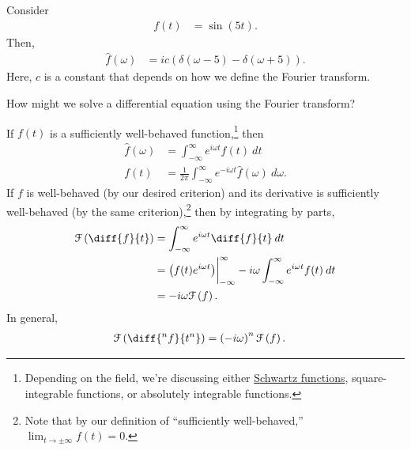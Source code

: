 \documentclass[10pt]{mypackage}
\begin{document}
\begin{example}
  Consider
  \begin{align*}
    f(t) &= \sin\left( 5t \right).
  \end{align*}
  Then,
  \begin{align*}
    \hat{f}\left( \omega \right) &= ic\left( \delta\left(\omega - 5\right) - \delta\left( \omega + 5 \right) \right).
  \end{align*}
  Here, $c$ is a constant that depends on how we define the Fourier transform.
\end{example}
\begin{example}
  How might we solve a differential equation using the Fourier transform?\newline

  If $f(t)$ is a sufficiently well-behaved function,\footnote{Depending on the field, we're discussing either \href{https://en.wikipedia.org/wiki/Schwartz_space}{Schwartz functions}, square-integrable functions, or absolutely integrable functions.} then
  \begin{align*}
    \hat{f}\left( \omega \right) &= \int_{-\infty}^{\infty} e^{i\omega t}f(t)\:dt\\
    f(t) &= \frac{1}{2\pi}\int_{-\infty}^{\infty} e^{-i\omega t}\hat{f}(\omega)\:d\omega.
  \end{align*}
  If $f$ is well-behaved (by our desired criterion) and its derivative is sufficiently well-behaved (by the same criterion),\footnote{Note that by our definition of ``sufficiently well-behaved,'' $\lim_{t\rightarrow\pm\infty}f(t) = 0$.} then by integrating by parts,
  \begin{align*}
    \mathcal{F}\left( \diff{f}{t} \right) &= \int_{-\infty}^{\infty} e^{i\omega t}\diff{f}{t}\:dt\\
                                          &= \left( f(t)e^{i\omega t} \right)\biggr\vert_{-\infty}^{\infty} -i\omega \int_{-\infty}^{\infty} e^{i\omega t}f(t)\:dt\\
                                          &= -i\omega \mathcal{F}\left( f \right).
  \end{align*}
  In general,
  \begin{align*}
    \mathcal{F}\left( \diff{^nf}{t^n} \right) &= \left( -i\omega \right)^{n} \mathcal{F}\left( f \right).
  \end{align*}
\end{example}
\end{document}
